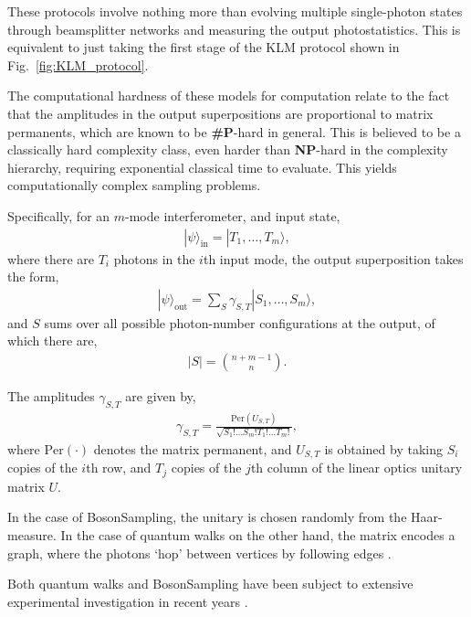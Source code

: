 \documentclass[aps,rmp,twocolumn,amsmath,amssymb,nofootinbib,superscriptaddress]{revtex4}
\newcommand{\ket}[1]{|#1\rangle}
\begin{document}
These protocols involve nothing more than evolving multiple single-photon states through beamsplitter networks and measuring the output photostatistics. This is equivalent to just taking the first stage of the KLM protocol shown in Fig.~\ref{fig:KLM_protocol}.

The computational hardness of these models for computation relate to the fact that the amplitudes in the output superpositions are proportional to matrix permanents, which are known to be \textbf{\#P}-hard in general. This is believed to be a classically hard complexity class, even harder than \textbf{NP}-hard in the complexity hierarchy, requiring exponential classical time to evaluate. This yields computationally complex sampling problems.

Specifically, for an $m$-mode interferometer, and input state,
\begin{align}
\ket\psi_\mathrm{in} = \ket{T_1,\dots,T_m},
\end{align}
where there are $T_i$ photons in the $i$th input mode, the output superposition takes the form,
\begin{align}
\ket\psi_\mathrm{out} = \sum_S \gamma_{S,T} \ket{S_1,\dots,S_m},
\end{align}
and $S$ sums over all possible photon-number configurations at the output, of which there are,
\begin{align}
|S| = \binom{n+m-1}{n}.
\end{align}

The amplitudes $\gamma_{S,T}$ are given by,
\begin{align}
\gamma_{S,T} = \frac{\mathrm{Per}(U_{S,T})}{\sqrt{S_1!\dots S_m! T_1!\dots T_m!}},
\end{align}
where $\mathrm{Per}(\cdot)$ denotes the matrix permanent, and $U_{S,T}$ is obtained by taking $S_i$ copies of the $i$th row, and $T_j$ copies of the $j$th column of the linear optics unitary matrix $U$.

In the case of {\sc BosonSampling}, the unitary is chosen randomly from the Haar-measure. In the case of quantum walks on the other hand, the matrix encodes a graph, where the photons `hop' between vertices by following edges \cite{RohdeQWintro}.

Both quantum walks and {\sc BosonSampling} have been subject to extensive experimental investigation in recent years \cite{bib:PeruzzoQW, bib:Broome10, bib:Schreiber11b, bib:Owens11, bib:RohdeQWExp12, bib:Broome2012, bib:RohdeQWExp12, bib:Spring2, bib:Crespi3, bib:Tillmann4}.
\end{document}
